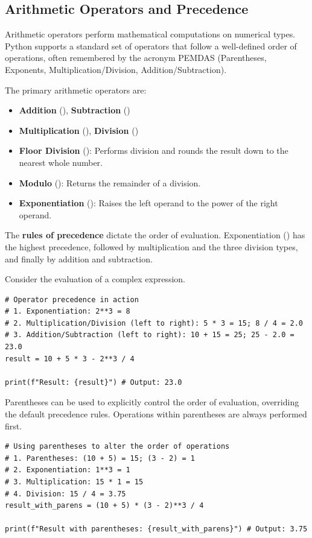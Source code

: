 \subsection{Arithmetic Operators and Precedence}
\label{subsec:arithmetic_operators}
Arithmetic operators perform mathematical computations on numerical types. Python supports a standard set of operators that follow a well-defined order of operations, often remembered by the acronym PEMDAS (Parentheses, Exponents, Multiplication/Division, Addition/Subtraction).

The primary arithmetic operators are:
\begin{itemize}
    \item \textbf{Addition} (\code{+}), \textbf{Subtraction} (\code{-})
    \item \textbf{Multiplication} (\code{*}), \textbf{Division} (\code{/})
    \item \textbf{Floor Division} (\code{//}): Performs division and rounds the result down to the nearest whole number.
    \item \textbf{Modulo} (\code{\%}): Returns the remainder of a division.
    \item \textbf{Exponentiation} (\code{**}): Raises the left operand to the power of the right operand.
\end{itemize}

The \textbf{rules of precedence} dictate the order of evaluation. Exponentiation (\code{**}) has the highest precedence, followed by multiplication and the three division types, and finally by addition and subtraction.

\begin{example}
Consider the evaluation of a complex expression.
\text{ }\begin{verbatim}
# Operator precedence in action
# 1. Exponentiation: 2**3 = 8
# 2. Multiplication/Division (left to right): 5 * 3 = 15; 8 / 4 = 2.0
# 3. Addition/Subtraction (left to right): 10 + 15 = 25; 25 - 2.0 = 23.0
result = 10 + 5 * 3 - 2**3 / 4

print(f"Result: {result}") # Output: 23.0
\end{verbatim}
Parentheses \code{()} can be used to explicitly control the order of evaluation, overriding the default precedence rules. Operations within parentheses are always performed first.
\text{ }\begin{verbatim}
# Using parentheses to alter the order of operations
# 1. Parentheses: (10 + 5) = 15; (3 - 2) = 1
# 2. Exponentiation: 1**3 = 1
# 3. Multiplication: 15 * 1 = 15
# 4. Division: 15 / 4 = 3.75
result_with_parens = (10 + 5) * (3 - 2)**3 / 4

print(f"Result with parentheses: {result_with_parens}") # Output: 3.75
\end{verbatim}
\end{example}

